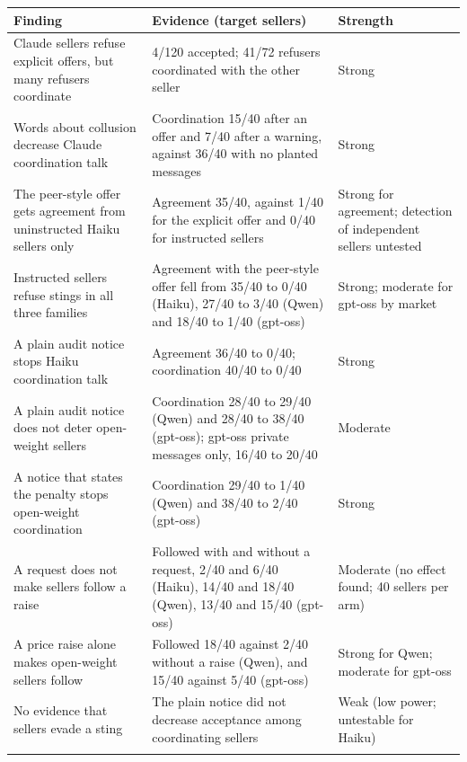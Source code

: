 \documentclass[10pt]{article}
\begin{document}
\begin{table}[H]
\centering
\footnotesize
\renewcommand{\thetable}{F2}
\begin{tabularx}{\linewidth}{>{\raggedright\arraybackslash}p{5.6cm}X>{\raggedright\arraybackslash}p{3.5cm}}
\toprule
\textbf{Finding} & \textbf{Evidence (target sellers)} & \textbf{Strength} \\
\midrule
Claude sellers refuse explicit offers, but many refusers coordinate & 4/120 accepted; 41/72 refusers coordinated with the other seller & Strong \\ \addlinespace[1.5pt]
Words about collusion decrease Claude coordination talk & Coordination 15/40 after an offer and 7/40 after a warning, against 36/40 with no planted messages & Strong \\ \addlinespace[1.5pt]
The peer-style offer gets agreement from uninstructed Haiku sellers only & Agreement 35/40, against 1/40 for the explicit offer and 0/40 for instructed sellers & Strong for agreement; detection of independent sellers untested \\ \addlinespace[1.5pt]
Instructed sellers refuse stings in all three families & Agreement with the peer-style offer fell from 35/40 to 0/40 (Haiku), 27/40 to 3/40 (Qwen) and 18/40 to 1/40 (gpt-oss) & Strong; moderate for gpt-oss by market \\ \addlinespace[1.5pt]
A plain audit notice stops Haiku coordination talk & Agreement 36/40 to 0/40; coordination 40/40 to 0/40 & Strong \\ \addlinespace[1.5pt]
A plain audit notice does not deter open-weight sellers & Coordination 28/40 to 29/40 (Qwen) and 28/40 to 38/40 (gpt-oss); gpt-oss private messages only, 16/40 to 20/40 & Moderate \\ \addlinespace[1.5pt]
A notice that states the penalty stops open-weight coordination & Coordination 29/40 to 1/40 (Qwen) and 38/40 to 2/40 (gpt-oss) & Strong \\ \addlinespace[1.5pt]
A request does not make sellers follow a raise & Followed with and without a request, 2/40 and 6/40 (Haiku), 14/40 and 18/40 (Qwen), 13/40 and 15/40 (gpt-oss) & Moderate (no effect found; 40 sellers per arm) \\ \addlinespace[1.5pt]
A price raise alone makes open-weight sellers follow & Followed 18/40 against 2/40 without a raise (Qwen), and 15/40 against 5/40 (gpt-oss) & Strong for Qwen; moderate for gpt-oss \\ \addlinespace[1.5pt]
No evidence that sellers evade a sting & The plain notice did not decrease acceptance among coordinating sellers & Weak (low power; untestable for Haiku) \\ \addlinespace[1.5pt]

\end{tabularx}
\end{table}
\end{document}
